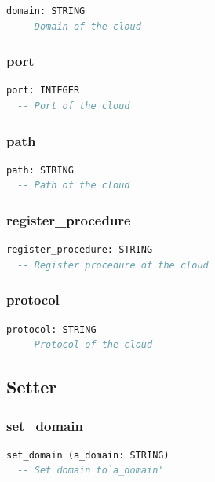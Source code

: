 \begin{lstlisting}[language=Eiffel]
domain: STRING
  -- Domain of the cloud
\end{lstlisting}

\subsubsection{port}

\begin{lstlisting}[language=Eiffel]
port: INTEGER
  -- Port of the cloud
\end{lstlisting}

\subsubsection{path}

\begin{lstlisting}[language=Eiffel]
path: STRING
  -- Path of the cloud
\end{lstlisting}

\subsubsection{register\_procedure}

\begin{lstlisting}[language=Eiffel]
register_procedure: STRING
  -- Register procedure of the cloud
\end{lstlisting}

\subsubsection{protocol}

\begin{lstlisting}[language=Eiffel]
protocol: STRING
  -- Protocol of the cloud
\end{lstlisting}

\subsection{Setter}
\label{sec:channel-cloud-setter}

\subsubsection{set\_domain}

\begin{lstlisting}[language=Eiffel]
set_domain (a_domain: STRING)
  -- Set domain to`a_domain'
\end{lstlisting}

